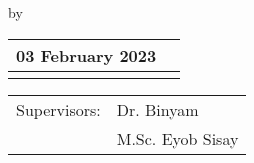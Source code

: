 \begin{titlepage}
\newpage

\setlength{\headheight}{14pt}
 \begin{center}

{\makeatletter
\largetitlestyle\fontsize{45}{45}\selectfont\@title
\makeatother}

{\makeatletter
\ifdefvoid{\@subtitle}{}{\bigskip\fontsize{20}{20}\selectfont\@subtitle}
\makeatother}

\bigskip
\bigskip

by

\bigskip
\bigskip

{\makeatletter
\largetitlestyle\fontsize{25}{25}\selectfont\@author
\makeatother}

\bigskip
\bigskip

\setlength\extrarowheight{2pt}
\begin{tabular}{lc}
 03 February 2023\\\midrule
     \\
\end{tabular}

\vfill

\begin{tabular}{ll}
    Supervisors: & Dr. Binyam \\
                 & M.Sc. Eyob Sisay\\
\end{tabular}

\bigskip
\bigskip



\end{center}

	
\end{titlepage}